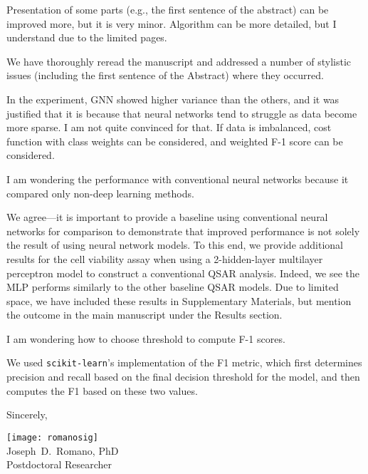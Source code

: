 \documentclass{ibilttr}
\begin{document}
\vspace{-1em}
\begin{displayquote}
Presentation of some parts (e.g., the first sentence of the abstract)
can be improved more, but it is very minor. Algorithm can be more
detailed, but I understand due to the limited pages.
\end{displayquote}

We have thoroughly reread the manuscript and addressed a number of
stylistic issues (including the first sentence of the Abstract) where
they occurred.

\begin{displayquote}
In the experiment, GNN showed higher variance than the others,
and it was justified that it is because that neural networks tend to
struggle as data become more sparse. I am not quite convinced for
that. If data is imbalanced, cost function with class weights can be
considered, and weighted F-1 score can be considered.
\end{displayquote}

\begin{displayquote}
I am wondering the performance with conventional neural networks
because it compared only non-deep learning methods.
\end{displayquote}

We agree---it is important to provide a baseline using conventional
neural networks for comparison to demonstrate that improved
performance is not solely the result of using neural network
models. To this end, we provide additional results for the cell
viability assay when using a 2-hidden-layer multilayer perceptron
model to construct a conventional QSAR analysis. Indeed, we see the
MLP performs similarly to the other baseline QSAR models. Due to
limited space, we have included these results in Supplementary
Materials, but mention the outcome in the main manuscript under the
Results section.

\begin{displayquote}
I am wondering how to choose threshold to compute F-1 scores.
\end{displayquote}

We used \texttt{scikit-learn}'s implementation of the F1 metric, which
first determines precision and recall based on the final decision
threshold for the model, and then computes the F1 based on these two
values.

\vspace{2ex} Sincerely,

\texttt{[image: romanosig]}\\[-0.2\baselineskip]

Joseph~D.~Romano, PhD\\ Postdoctoral Researcher
\end{document}
